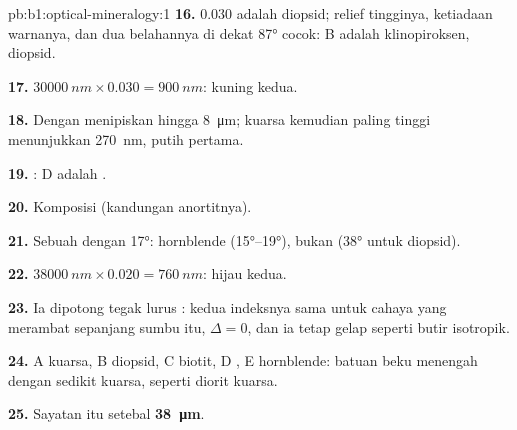 \begin{solution}{pb:b1:optical-mineralogy:1}
\textbf{16.} $0.030$ adalah  diopsid; relief tingginya, ketiadaan warnanya, dan dua belahannya di dekat \ang{87} cocok: B adalah klinopiroksen, diopsid.

\textbf{17.} $\qty{30000}{nm}\times0.030 = \qty{900}{nm}$: kuning  kedua.

\textbf{18.} Dengan menipiskan hingga \qty{8}{\micro m}; kuarsa kemudian paling tinggi menunjukkan \qty{270}{nm}, putih  pertama.

\textbf{19.} : D adalah .

\textbf{20.} Komposisi  (kandungan anortitnya).

\textbf{21.} Sebuah  dengan  \ang{17}: hornblende
(\ang{15}--\ang{19}), bukan  (\ang{38} untuk diopsid).

\textbf{22.} $\qty{38000}{nm}\times0.020 = \qty{760}{nm}$: hijau  kedua.

\textbf{23.} Ia dipotong tegak lurus : kedua indeksnya sama untuk cahaya yang merambat sepanjang sumbu itu, $\Delta = 0$, dan ia tetap gelap seperti butir isotropik.

\textbf{24.} A kuarsa, B diopsid, C biotit, D , E hornblende: batuan beku menengah dengan sedikit kuarsa, seperti diorit kuarsa.

\textbf{25.} Sayatan itu setebal \textbf{\qty[text-series-to-math=true]{38}{\micro m}}.
\end{solution}
